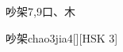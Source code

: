 \begin{entry}{吵架}{7,9}{⼝、⽊}
  \begin{phonetics}{吵架}{chao3jia4}[][HSK 3]
  \end{phonetics}
\end{entry}
